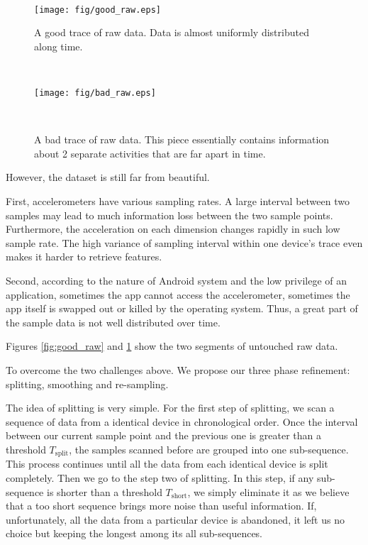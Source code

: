 \documentclass{article} %
\begin{document}
\begin{figure}
    \hspace{-0.5cm}
    \begin{minipage}[t]{0.02\textwidth}~
    \end{minipage}
    \begin{minipage}[t]{0.47\textwidth}
    \centering
    \texttt{[image: fig/good\_raw.eps]}
    \caption{A good trace of raw data. Data is almost uniformly distributed along time. }
    \label{fig:good_raw}
    \end{minipage}
    \begin{minipage}[t]{0.02\textwidth}~
    \end{minipage}
    \begin{minipage}[t]{0.47\textwidth}
    \centering
    \texttt{[image: fig/bad\_raw.eps]}\\
    \caption{A bad trace of raw data. This piece essentially contains information about 2 separate activities that are far apart in time.}
    \label{fig:bad_raw}
    \end{minipage}
    \begin{minipage}[t]{0.02\textwidth}~
    \end{minipage}%
 \end{figure}


However, the dataset is still far from beautiful.

First, accelerometers have various sampling rates. A large interval between two samples may lead to much information loss between the two sample points. Furthermore, the acceleration on each dimension changes rapidly in such low sample rate. The high variance of sampling interval within one device's trace even makes it harder to retrieve features.

Second, according to the nature of Android system and the low privilege of an application, sometimes the app cannot access the accelerometer, sometimes the app itself is swapped out or killed by the operating system. Thus, a great part of the sample data is not well distributed over time.

Figures \ref{fig:good_raw} and \ref{fig:bad_raw} show the two segments of untouched raw data. 

To overcome the two challenges above. We propose our three phase refinement: splitting, smoothing and re-sampling.

The idea of splitting is very simple. For the first step of splitting, we scan a sequence of data from a identical device in chronological order. Once the interval between our current sample point and the previous one is greater than a threshold $T_\mathrm{split}$, the samples scanned before are grouped into one sub-sequence. This process continues until all the data from each identical device is split completely. Then we go to the step two of splitting. In this step, if any sub-sequence is shorter than a threshold $T_\mathrm{short}$, we simply eliminate it as we believe that a too short sequence brings more noise than useful information. If, unfortunately, all the data from a particular device is abandoned, it left us no choice but keeping the longest among its all sub-sequences.
\end{document}
